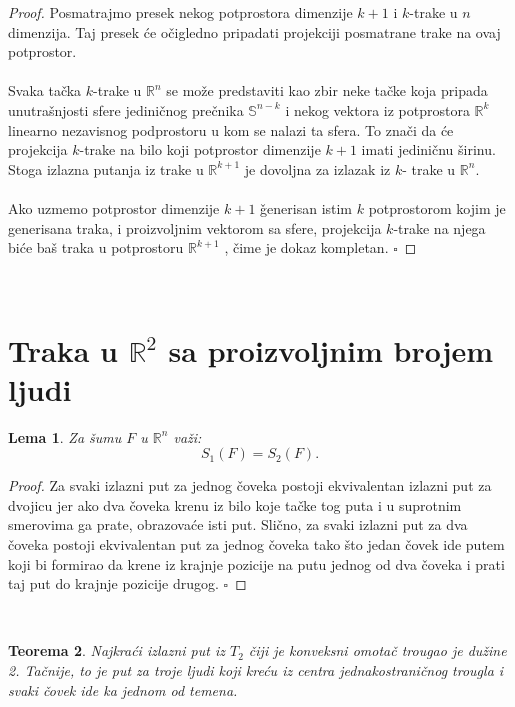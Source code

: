 \documentclass[11pt,letter]{article}
\newtheorem{teo}{\bf Teorema}[section]
\newtheorem{lem}[teo]{\bf Lema}
\begin{document}
\begin{proof}
Posmatrajmo presek nekog potprostora dimenzije $k+1$ i $k$-trake u $n$ dimenzija. Taj presek \' ce o\v cigledno pripadati projekciji posmatrane trake na ovaj potprostor.
\\
\\
\indent  Svaka ta\v cka $k$-trake u $\mathbb{R}^n$ se mo\v ze predstaviti kao zbir neke ta\v cke koja pripada unutra\v snjosti sfere jedini\v cnog pre\v cnika $\mathbb{S}^{n-k}$ i nekog vektora iz potprostora $\mathbb{R}^k$ linearno nezavisnog podprostoru u kom se nalazi ta sfera. To zna\v ci da \' ce projekcija $k$-trake na bilo koji potprostor dimenzije $k+1$ imati jedini\v cnu \v sirinu. Stoga izlazna putanja iz trake u  $\mathbb{R}^{k+1}$ je dovoljna za izlazak iz $k$- trake u $\mathbb{R}^n$. 
\\
\\
\indent Ako uzmemo potprostor dimenzije $k+1$ \v generisan istim $k$ potprostorom kojim je generisana traka, i proizvoljnim vektorom sa sfere, projekcija $k$-trake na njega bi\' ce ba\v s traka u potprostoru $\mathbb{R}^{k+1}$ , \v cime je dokaz kompletan.
$\square$
\end{proof}
\\

\section[Traka u $\mathbb{R}^2$ sa proizvoljnim brojem ljudi]{Traka u $\mathbb{R}^2$ sa proizvoljnim brojem ljudi}

\begin{lem} Za \v sumu $F$ u $\mathbb{R}^n$ va\v zi: $$S_1(F)=S_2(F).$$\end{lem}

\begin{proof}
Za svaki izlazni put za jednog \v coveka postoji ekvivalentan izlazni put za dvojicu jer ako dva \v coveka krenu iz bilo koje ta\v cke tog puta i u suprotnim smerovima ga prate, obrazova\' ce isti put. Sli\v cno, za svaki izlazni put za dva \v coveka postoji ekvivalentan put za jednog \v coveka tako \v sto jedan \v covek ide putem koji bi formirao da krene iz krajnje pozicije na putu jednog od dva \v coveka i prati taj put do krajnje pozicije drugog.
$\square$
\end{proof}
\\
\begin{teo} Najkra\' ci izlazni put iz $T_2$ \v ciji je konveksni omota\v c trougao je du\v zine 2. Ta\v cnije, to je put za troje ljudi koji kre\' cu iz centra jednakostrani\v cnog trougla i svaki \v covek ide ka jednom od temena.
\end{teo}
\end{document}
